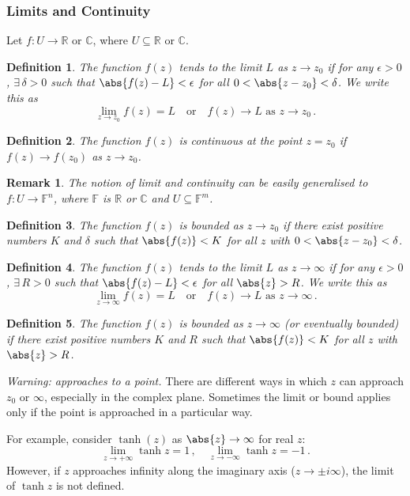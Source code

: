 \documentclass{article}
\theoremstyle{plain}\theoremheaderfont{\normalfont\itshape}\theorembodyfont{\rmfamily}\theoremseparator{.}\newtheorem*{rem}{Remark}\newtheorem*{ex}{Example}\newtheorem*{proof}{Proof}\newtheorem*{altp}{Alternative proof}
\theoremstyle{plain}\theoremheaderfont{\normalfont\bfseries}\theorembodyfont{\rmfamily}\theoremseparator{.}\newtheorem{thm}{Theorem}[section]\newtheorem{lem}[thm]{Lemma}\newtheorem{prop}[thm]{Proposition}\newtheorem*{cor}{Corollary}\newtheorem{defn}[thm]{Definition}\newtheorem{clm}[thm]{Claim}\newtheorem{clminproof}{Claim}
\theoremstyle{break}\theoremheaderfont{\normalfont\itshape}\theorembodyfont{\rmfamily}\theoremseparator{.\medskip}\newtheorem*{proofskip}{Proof}\newtheorem*{exs}{Examples}\newtheorem*{rems}{Remarks}
\theoremstyle{break}\theoremheaderfont{\normalfont\bfseries}\theorembodyfont{\rmfamily}\theoremseparator{.\medskip}\newtheorem{lemskip}[thm]{Lemma}\newtheorem{defnskip}[thm]{Definition}\newtheorem{propskip}[thm]{Proposition}\newtheorem{thmskip}[thm]{Theorem}
\numberwithin{equation}{section}
\begin{document}
	\subsubsection{Limits and Continuity}
	Let \(f:U\to\mathbb{R}\) or \(\mathbb{C}\), where \(U\subseteq \mathbb{R}\) or \(\mathbb{C}\).
	\begin{defn}
		The function \(f(z)\) tends to the \textit{limit} \(L\) as \(z\to z_0\) if for any \(\epsilon>0\), \(\exists\,\delta>0\) such that \(\abs{f(z)-L}<\epsilon\) for all \(0<\abs{z-z_0}<\delta\).	We write this as
		\[\lim_{z\to z_0}f(z)=L\quad\text{or}\quad f(z)\to L\text{ as }z\to z_0\,.\]
	\end{defn}
	\begin{defn}
		The function \(f(z)\) is \textit{continuous} at the point \(z=z_0\) if \(f(z)\to f(z_0)\) as \(z\to z_0\).
	\end{defn}
	\begin{rem}
		The notion of limit and continuity can be easily generalised to \(f:U\to\mathbb{F}^n\), where \(\mathbb{F}\) is \(\mathbb{R}\) or \(\mathbb{C}\) and \(U\subseteq\mathbb{F}^m\).
	\end{rem}
	\begin{defn}
		The function \(f(z)\) is \textit{bounded} as \(z\to z_0\) if there exist positive numbers \(K\) and \(\delta\) such that \(\abs{f(z)}<K\) for all \(z\) with \(0<\abs{z-z_0}<\delta\).
	\end{defn}
	\begin{defn}
		The function \(f(z)\) tends to the \textit{limit} \(L\) as \(z\to \infty\) if for any \(\epsilon>0\), \(\exists\,R>0\) such that \(\abs{f(z)-L}<\epsilon\) for all \(\abs{z}>R\). We write this as
		\[\lim_{z\to\infty}f(z)=L\quad\text{or}\quad f(z)\to L\text{ as }z\to\infty\,.\]
	\end{defn}
	\begin{defn}
		The function \(f(z)\) is \textit{bounded} as \(z\to\infty\) (or \textit{eventually bounded}) if there exist positive numbers \(K\) and \(R\) such that \(\abs{f(z)}<K\) for all \(z\) with \(\abs{z}>R\).
	\end{defn}
	\textit{Warning: approaches to a point.} There are different ways in which \(z\) can approach \(z_0\) or \(\infty\), especially in the complex plane. Sometimes the limit or bound applies only if the point is approached in a particular way.
		
	For example, consider \(\tanh(z)\) as \(\abs{z}\to\infty\) for real \(z\):
	\[\lim_{z\to +\infty}\tanh z=1\,,\quad\lim_{z\to -\infty}\tanh z=-1\,.\]
	However, if \(z\) approaches infinity along the imaginary axis (\(z\to\pm i\infty\)), the limit of \(\tanh z\) is not defined.
\end{document}
